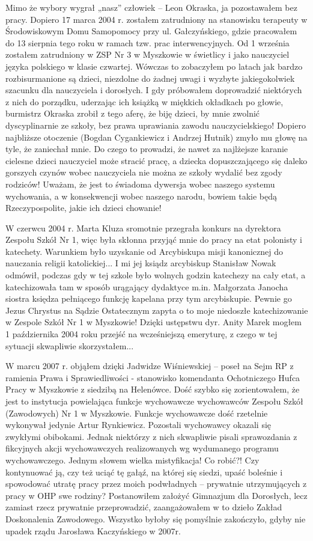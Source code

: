 Mimo że wybory wygrał „nasz” człowiek – Leon Okraska, ja pozostawałem bez pracy. Dopiero 17 marca 2004 r. zostałem zatrudniony na stanowisku terapeuty w Środowiskowym Domu Samopomocy przy ul. Gałczyńskiego, gdzie pracowałem do 13 sierpnia tego roku w ramach tzw. prac interwencyjnych. Od 1 września zostałem zatrudniony w ZSP Nr 3 w Myszkowie w świetlicy i jako nauczyciel języka polskiego w klasie czwartej. Wówczas to zobaczyłem po latach jak bardzo rozbisurmanione są dzieci, niezdolne do żadnej uwagi i wyzbyte jakiegokolwiek szacunku dla nauczyciela i dorosłych. I gdy próbowałem doprowadzić niektórych z nich do porządku, uderzając ich książką w miękkich okładkach po głowie, burmistrz Okraska zrobił z tego aferę, że biję dzieci, by mnie zwolnić dyscyplinarnie ze szkoły, bez prawa uprawiania zawodu nauczycielskiego! Dopiero najbliższe otoczenie (Bogdan Cygankiewicz i Andrzej Hutnik) zmyło mu głowę na tyle, że zaniechał mnie. Do czego to prowadzi, że nawet za najlżejsze karanie cielesne dzieci nauczyciel może stracić pracę, a dziecka dopuszczającego się daleko gorszych czynów wobec nauczyciela nie można ze szkoły wydalić bez zgody rodziców! Uważam, że jest to świadoma dywersja wobec naszego systemu wychowania, a w konsekwencji wobec naszego narodu, bowiem takie będą Rzeczypospolite, jakie ich dzieci chowanie!

W czerwcu 2004 r. Marta Kluza sromotnie przegrała konkurs na dyrektora Zespołu Szkół Nr 1, więc była skłonna przyjąć mnie do pracy na etat polonisty i katechety. Warunkiem było uzyskanie od Arcybiskupa misji kanonicznej do nauczania religii katolickiej... I mi jej ksiądz arcybiskup Stanisław Nowak odmówił, podczas gdy w tej szkole było wolnych godzin katechezy na cały etat, a katechizowała tam w sposób urągający dydaktyce m.in. Małgorzata Janocha  siostra księdza pełniącego funkcję kapelana przy tym arcybiskupie. Pewnie go Jezus Chrystus na Sądzie Ostatecznym zapyta o to moje niedoszłe katechizowanie w Zespole Szkół Nr 1 w Myszkowie!  Dzięki ustępstwu dyr. Anity Marek mogłem 1 października 2004 roku przejść na wcześniejszą emeryturę, z czego w tej sytuacji skwapliwie skorzystałem...

W marcu 2007 r. objąłem dzięki Jadwidze Wiśniewskiej – poseł na Sejm RP z ramienia Prawa i Sprawiedliwości - stanowisko komendanta Ochotniczego Hufca Pracy w Myszkowie z siedzibą na Helenówce. Dość szybko się zorientowałem, że jest to instytucja powielająca funkcje wychowawcze wychowawców Zespołu Szkół (Zawodowych) Nr 1 w Myszkowie. Funkcje wychowawcze dość rzetelnie wykonywał jedynie Artur Rynkiewicz. Pozostali wychowawcy okazali się zwykłymi obibokami. Jednak niektórzy z nich skwapliwie pisali sprawozdania z fikcyjnych akcji wychowawczych realizowanych wg wydumanego programu wychowawczego. Jednym słowem wielka mistyfikacja! Co robić?! Czy kontynuować ją, czy też uciąć tę gałąź, na której się siedzi, upaść boleśnie i spowodować utratę pracy przez moich podwładnych – prywatnie utrzymujących z pracy w OHP swe rodziny? Postanowiłem założyć Gimnazjum dla Dorosłych, lecz zamiast rzecz prywatnie przeprowadzić, zaangażowałem w to dzieło Zakład Doskonalenia Zawodowego. Wszystko byłoby się pomyślnie zakończyło, gdyby nie upadek rządu Jarosława Kaczyńskiego w 2007r.

